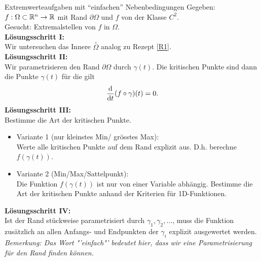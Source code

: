 \begin{Rezept}[label=R2]{Extremwerteaufgaben mit ``einfachen'' Nebenbedingungen}{}
	Gegeben: $f:\Omega\subset \mathbb{R}^n \to \mathbb{R}$ mit Rand $\partial{\Omega}$ und $f$ von der Klasse $C^2$.\\
	Gesucht: Extremalstellen von $f$ in $\Omega$.\\
	\newline
	\textbf{Lösungsschritt I:}\\
	Wir untersuchen das Innere $\overset{\circ}{\Omega}$ analog zu Rezept \ref{R1}.\\
	\newline
	\textbf{Lösungsschritt II:}\\
	Wir parametrisieren den Rand $\partial \Omega$ durch $\gamma(t)$. Die kritischen Punkte sind dann die Punkte $\gamma(t)$ für die gilt
	\begin{equation*}
	\dv{t}(f\circ \gamma)(t) = 0.
	\end{equation*}
	\newline
	\textbf{Lösungsschritt III:}\\
	Bestimme die Art der kritischen Punkte.
	\begin{itemize}
		\item Variante 1 (nur kleinstes Min/ grösstes Max): \\Werte alle kritischen Punkte auf dem Rand explizit aus. D.h. berechne $f(\gamma(t))$.
		\item Variante 2 (Min/Max/Sattelpunkt):\\
		Die Funktion $f(\gamma(t))$ ist nur von einer Variable abhängig. Bestimme die Art der kritischen Punkte anhand der Kriterien für 1D-Funktionen.
	\end{itemize}
	
	\textbf{Lösungsschritt IV:}\\
	Ist der Rand stückweise parametrisiert durch $\gamma_1,\gamma_2,\dots$, muss die Funktion zusätzlich an allen Anfangs- und Endpunkten der $\gamma_i$  explizit ausgewertet werden.\\
	\newline
	\textit{Bemerkung: Das Wort "'einfach"' bedeutet hier, dass wir eine Parametrisierung für den Rand finden können.}
\end{Rezept}
